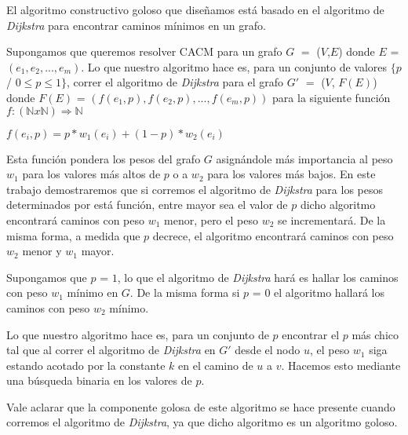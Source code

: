 El algoritmo constructivo goloso que diseñamos está basado en el algoritmo de \emph{Dijkstra} para encontrar caminos mínimos en un grafo. 

Supongamos que queremos resolver CACM para un grafo $G$ $=$ ($V$,$E$) donde $E$ = $(e_1, e_2, ..., e_m)$. Lo que nuestro algoritmo hace es, para un conjunto de valores $\{p$ / $0 \leq p \leq 1\}$, correr el algoritmo de \emph{Dijkstra} para el grafo $G'$ $=$ ($V$, $F(E)$) donde $F(E)$ = $(f(e_1,p), f(e_2,p), ...,f(e_m,p))$ para la siguiente función $f: (\mathbb{N} x \mathbb{N}) \Rightarrow \mathbb{N}$

$f(e_i,p) = p*w_1(e_i) + (1-p)*w_2(e_i)$

Esta función pondera los pesos del grafo $G$ asignándole más importancia al peso $w_1$ para los valores más altos de $p$ o a $w_2$ para los valores más bajos. En este trabajo demostraremos que si corremos el algoritmo de \emph{Dijkstra} para los pesos determinados por está función, entre mayor sea el valor de $p$ dicho algoritmo encontrará caminos con peso $w_1$ menor, pero el peso $w_2$ se incrementará. De la misma forma, a medida que $p$ decrece, el algoritmo encontrará caminos con peso $w_2$ menor y $w_1$ mayor.

Supongamos que $p$ = $1$, lo que el algoritmo de \emph{Dijkstra} hará es hallar los caminos con peso $w_1$ mínimo en $G$. De la misma forma si $p$ = $0$ el algoritmo hallará los caminos con peso $w_2$ mínimo.

Lo que nuestro algoritmo hace es, para un conjunto de $p$ encontrar el $p$ más chico tal que al correr el algoritmo de \emph{Dijkstra} en $G'$ desde el nodo $u$, el peso $w_1$ siga estando acotado por la constante $k$ en el camino de $u$ a $v$. Hacemos esto mediante una búsqueda binaria en los valores de $p$.

Vale aclarar que la componente golosa de este algoritmo se hace presente cuando corremos el algoritmo de \emph{Dijkstra}, ya que dicho algoritmo es un algoritmo goloso.